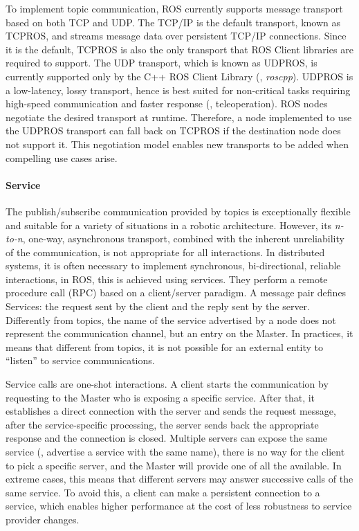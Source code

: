 To implement topic communication, ROS currently supports message transport based on both TCP and UDP. The TCP/IP is the default transport, known as TCPROS, and streams message data over persistent TCP/IP connections. Since it is the default, TCPROS is also the only transport that ROS Client libraries are required to support. The UDP transport, which is known as UDPROS, is currently supported only by the C++ ROS Client Library (\ie, \textit{roscpp}). UDPROS is a low-latency, lossy transport, hence is best suited for non-critical tasks requiring high-speed communication and faster response (\eg, teleoperation). ROS nodes negotiate the desired transport at runtime. Therefore, a node implemented to use the UDPROS transport can fall back on TCPROS if the destination node does not support it. This negotiation model enables new transports to be added when compelling use cases arise. 

\paragraph{Service} The publish/subscribe communication provided by topics is exceptionally flexible and suitable for a variety of situations in a robotic architecture. However, its \textit{n-to-n}, one-way, asynchronous transport, combined with the inherent unreliability of the communication, is not appropriate for all interactions. In distributed systems, it is often necessary to implement synchronous, bi-directional, reliable interactions, in ROS, this is achieved using services. They perform a remote procedure call (RPC) based on a client/server paradigm. A message pair defines Services: the request sent by the client and the reply sent by the server. Differently from topics, the name of the service advertised by a node does not represent the communication channel, but an entry on the Master. In practices, it means that different from topics, it is not possible for an external entity to ``listen'' to service communications.

Service calls are one-shot interactions. A client starts the communication by requesting to the Master who is exposing a specific service. After that, it establishes a direct connection with the server and sends the request message, after the service-specific processing, the server sends back the appropriate response and the connection is closed. Multiple servers can expose the same service (\ie, advertise a service with the same name), there is no way for the client to pick a specific server, and the Master will provide one of all the available. In extreme cases, this means that different servers may answer successive calls of the same service. To avoid this, a client can make a persistent connection to a service, which enables higher performance at the cost of less robustness to service provider changes.

